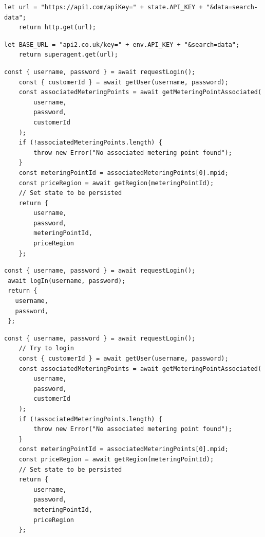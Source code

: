 \documentclass[jou,apacite]{apa6}
\begin{document}
\begin{lstlisting}[caption=Comparison 5a - Similar functions with literal and identifier name changes]
	let url = "https://api1.com/apiKey=" + state.API_KEY + "&data=search-data";
	return http.get(url);
\end{lstlisting}

\begin{lstlisting}[caption=Comparison 5b - Similar functions with literal and identifier name changes]
	let BASE_URL = "api2.co.uk/key=" + env.API_KEY + "&search=data";
	return superagent.get(url);
\end{lstlisting}

\begin{lstlisting}[caption=Comparison 6a - Real integration connect bodies]
    const { username, password } = await requestLogin();
    const { customerId } = await getUser(username, password);
    const associatedMeteringPoints = await getMeteringPointAssociated(
        username,
        password,
        customerId
    );
    if (!associatedMeteringPoints.length) {
        throw new Error("No associated metering point found");
    }
    const meteringPointId = associatedMeteringPoints[0].mpid;
    const priceRegion = await getRegion(meteringPointId);
    // Set state to be persisted
    return {
        username,
        password,
        meteringPointId,
        priceRegion
    };
\end{lstlisting}

\begin{lstlisting}[caption=Comparison 6b - Real integration connect bodies]
 const { username, password } = await requestLogin();
 await logIn(username, password);
 return {
   username,
   password,
 };
\end{lstlisting}

\begin{lstlisting}[caption=Comparison 7a - Real integration against order scrambled integration]
	const { username, password } = await requestLogin();
	// Try to login
	const { customerId } = await getUser(username, password);
	const associatedMeteringPoints = await getMeteringPointAssociated(
		username,
		password,
		customerId
	);
	if (!associatedMeteringPoints.length) {
		throw new Error("No associated metering point found");
	}
	const meteringPointId = associatedMeteringPoints[0].mpid;
	const priceRegion = await getRegion(meteringPointId);
	// Set state to be persisted
	return {
		username,
		password,
		meteringPointId,
		priceRegion
	};
\end{lstlisting}
\end{document}
